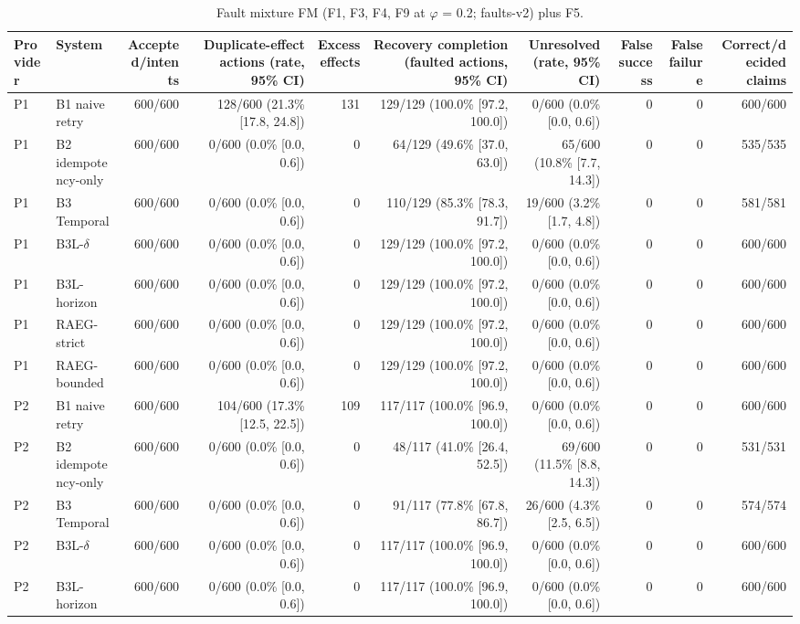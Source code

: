 \begin{table}[t]
\centering
\scriptsize
\caption{Fault mixture FM (F1, F3, F4, F9 at $\varphi$ = 0.2; faults-v2) plus F5.}
\label{tab:m7-fm}
\begin{tabular}{llrrrrrrrr}
\toprule
Provider & System & Accepted/intents & Duplicate-effect actions (rate, 95\% CI) & Excess effects & Recovery completion (faulted actions, 95\% CI) & Unresolved (rate, 95\% CI) & False success & False failure & Correct/decided claims \\
\midrule
P1 & B1 naive retry & 600/600 & 128/600 (21.3\% [17.8, 24.8]) & 131 & 129/129 (100.0\% [97.2, 100.0]) & 0/600 (0.0\% [0.0, 0.6]) & 0 & 0 & 600/600 \\
P1 & B2 idempotency-only & 600/600 & 0/600 (0.0\% [0.0, 0.6]) & 0 & 64/129 (49.6\% [37.0, 63.0]) & 65/600 (10.8\% [7.7, 14.3]) & 0 & 0 & 535/535 \\
P1 & B3 Temporal & 600/600 & 0/600 (0.0\% [0.0, 0.6]) & 0 & 110/129 (85.3\% [78.3, 91.7]) & 19/600 (3.2\% [1.7, 4.8]) & 0 & 0 & 581/581 \\
P1 & B3L-$\delta$ & 600/600 & 0/600 (0.0\% [0.0, 0.6]) & 0 & 129/129 (100.0\% [97.2, 100.0]) & 0/600 (0.0\% [0.0, 0.6]) & 0 & 0 & 600/600 \\
P1 & B3L-horizon & 600/600 & 0/600 (0.0\% [0.0, 0.6]) & 0 & 129/129 (100.0\% [97.2, 100.0]) & 0/600 (0.0\% [0.0, 0.6]) & 0 & 0 & 600/600 \\
P1 & RAEG-strict & 600/600 & 0/600 (0.0\% [0.0, 0.6]) & 0 & 129/129 (100.0\% [97.2, 100.0]) & 0/600 (0.0\% [0.0, 0.6]) & 0 & 0 & 600/600 \\
P1 & RAEG-bounded & 600/600 & 0/600 (0.0\% [0.0, 0.6]) & 0 & 129/129 (100.0\% [97.2, 100.0]) & 0/600 (0.0\% [0.0, 0.6]) & 0 & 0 & 600/600 \\
P2 & B1 naive retry & 600/600 & 104/600 (17.3\% [12.5, 22.5]) & 109 & 117/117 (100.0\% [96.9, 100.0]) & 0/600 (0.0\% [0.0, 0.6]) & 0 & 0 & 600/600 \\
P2 & B2 idempotency-only & 600/600 & 0/600 (0.0\% [0.0, 0.6]) & 0 & 48/117 (41.0\% [26.4, 52.5]) & 69/600 (11.5\% [8.8, 14.3]) & 0 & 0 & 531/531 \\
P2 & B3 Temporal & 600/600 & 0/600 (0.0\% [0.0, 0.6]) & 0 & 91/117 (77.8\% [67.8, 86.7]) & 26/600 (4.3\% [2.5, 6.5]) & 0 & 0 & 574/574 \\
P2 & B3L-$\delta$ & 600/600 & 0/600 (0.0\% [0.0, 0.6]) & 0 & 117/117 (100.0\% [96.9, 100.0]) & 0/600 (0.0\% [0.0, 0.6]) & 0 & 0 & 600/600 \\
P2 & B3L-horizon & 600/600 & 0/600 (0.0\% [0.0, 0.6]) & 0 & 117/117 (100.0\% [96.9, 100.0]) & 0/600 (0.0\% [0.0, 0.6]) & 0 & 0 & 600/600 \\

\end{tabular}
\end{table}
